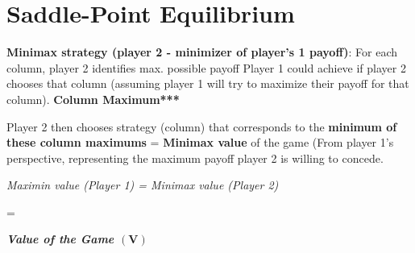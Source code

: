 \documentclass[../Main.tex]{subfiles}
\begin{document}
\section{Saddle-Point Equilibrium}


\textbf{Minimax strategy (player 2 - minimizer of player's 1 payoff)}: For each column, player 2 identifies max. possible payoff Player 1 could achieve if player 2 chooses that column (assuming player 1 will try to maximize their payoff for that column). \textbf{Column Maximum***}

Player 2 then chooses strategy (column) that corresponds to the \textbf{minimum of these column maximums} = \textbf{Minimax value} of the game (From player 1's perspective, representing the maximum payoff player 2 is willing to concede. 
\begin{center}
    \textit{Maximin value (Player 1) = Minimax value (Player 2)}

    =

    \textit{\textbf{Value of the Game $(\mathbf{V})$}}
\end{center}

\end{document}
